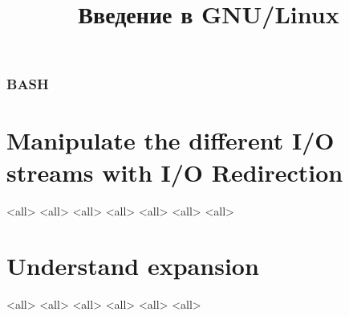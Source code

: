 
\title{Введение в GNU/Linux}




\begin{frame}
	\frametitle{BASH}
	\titlepage
	\vspace{-0.5cm}
	\begin{center}
	\end{center}
\end{frame}

\begin{frame}
	\tableofcontents
\end{frame}





\section{Manipulate the different I/O streams  with I/O Redirection}
\mode<all>{}
\mode<all>{}
\mode<all>{}
\mode<all>{}
\mode<all>{}
\mode<all>{}
\mode<all>{}


\section{Understand expansion}
\mode<all>{}
\mode<all>{}
\mode<all>{}
\mode<all>{}
\mode<all>{}
\mode<all>{}

